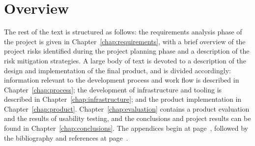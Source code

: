 \section*{Overview}\label{sec:overview}
The rest of the text is structured as follows: the requirements
analysis phase of the project is given in
Chapter~\ref{chap:requirements}, with a brief overview of the project
risks identified during the project planning phase and a description
of the risk mitigation strategies. A large body of text is devoted to
a description of the design and implementation of the final product,
and is divided accordingly: information relevant to the development
process and work flow is described in Chapter~\ref{chap:process}; the
development of infrastructure and tooling is described in
Chapter~\ref{chap:infrastructure}; and the product implementation in
Chapter~\ref{chap:product}. Chapter~\ref{chap:evaluation} contains a
product evaluation and the results of usability testing, and the
conclusions and project results can be found in
Chapter~\ref{chap:conclusions}. The appendices begin at
page~\pageref{appendices}, followed by the bibliography and references
at page~\pageref{bibliography}.
